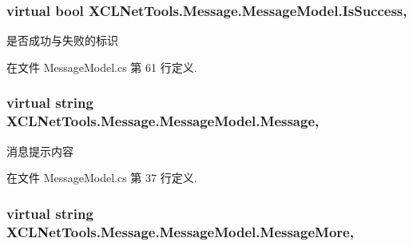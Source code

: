 \subsubsection[{\texorpdfstring{Is\+Success}{IsSuccess}}]{\setlength{\rightskip}{0pt plus 5cm}virtual bool X\+C\+L\+Net\+Tools.\+Message.\+Message\+Model.\+Is\+Success\hspace{0.3cm}{\ttfamily [get]}, {\ttfamily [set]}}\hypertarget{class_x_c_l_net_tools_1_1_message_1_1_message_model_a3881fb689ec30bfd21672b010a130675}{}\label{class_x_c_l_net_tools_1_1_message_1_1_message_model_a3881fb689ec30bfd21672b010a130675}


是否成功与失败的标识 



在文件 Message\+Model.\+cs 第 61 行定义.

\subsubsection[{\texorpdfstring{Message}{Message}}]{\setlength{\rightskip}{0pt plus 5cm}virtual string X\+C\+L\+Net\+Tools.\+Message.\+Message\+Model.\+Message\hspace{0.3cm}{\ttfamily [get]}, {\ttfamily [set]}}\hypertarget{class_x_c_l_net_tools_1_1_message_1_1_message_model_a1fb1dde64c832e59d688d9a9fe944da5}{}\label{class_x_c_l_net_tools_1_1_message_1_1_message_model_a1fb1dde64c832e59d688d9a9fe944da5}


消息提示内容 



在文件 Message\+Model.\+cs 第 37 行定义.

\subsubsection[{\texorpdfstring{Message\+More}{MessageMore}}]{\setlength{\rightskip}{0pt plus 5cm}virtual string X\+C\+L\+Net\+Tools.\+Message.\+Message\+Model.\+Message\+More\hspace{0.3cm}{\ttfamily [get]}, {\ttfamily [set]}}\hypertarget{class_x_c_l_net_tools_1_1_message_1_1_message_model_ae30c575345756a20443bb2f26ecdf1e9}{}\label{class_x_c_l_net_tools_1_1_message_1_1_message_model_ae30c575345756a20443bb2f26ecdf1e9}


